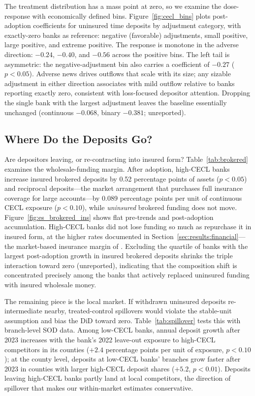The treatment distribution has a mass point at zero, so we examine the
dose-response with economically defined bins.  Figure~\ref{fig:cecl_bins}
plots post-adoption coefficients for uninsured time deposits by adjustment
category, with exactly-zero banks as reference: negative (favorable)
adjustments, small positive, large positive, and extreme positive.  The
response is monotone in the adverse direction: $-0.24$, $-0.40$, and
$-0.56$ across the positive bins.  The left tail is asymmetric: the
negative-adjustment bin also carries a coefficient of $-0.27$
($p<0.05$).  Adverse news drives outflows that scale with its size; any
sizable adjustment in either direction associates with mild outflow
relative to banks reporting exactly zero, consistent with loss-focused
depositor attention.  Dropping the single bank with the largest adjustment
leaves the baseline essentially unchanged (continuous $-0.068$, binary
$-0.381$; unreported).

\subsection{Where Do the Deposits Go?}
\label{sec:robustness:destination}

Are depositors leaving, or re-contracting into insured form?
Table~\ref{tab:brokered} examines the wholesale-funding margin.  After
adoption, high-CECL banks increase insured brokered deposits by 0.52
percentage points of assets ($p<0.05$) and reciprocal deposits---the
market arrangement that purchases full insurance coverage for large
accounts---by 0.089 percentage points per unit of continuous CECL exposure
($p<0.10$), while \emph{uninsured} brokered funding does not move.
Figure~\ref{fig:es_brokered_ins} shows flat pre-trends and post-adoption
accumulation.  High-CECL banks did not lose funding so much as repurchase
it in insured form, at the higher rates documented in
Section~\ref{sec:results:financial}---the market-based insurance margin of
\citet{kim2024insurance}.  Excluding the quartile of banks with the
largest post-adoption growth in insured brokered deposits shrinks the
triple interaction toward zero (unreported), indicating that the
composition shift is concentrated precisely among the banks that actively
replaced uninsured funding with insured wholesale money.

The remaining piece is the local market.  If withdrawn uninsured deposits
re-intermediate nearby, treated-control spillovers would violate the
stable-unit assumption and bias the DiD toward zero.
Table~\ref{tab:spillover} tests this with branch-level SOD data.  Among
low-CECL banks, annual deposit growth after 2023 increases with the
bank's 2022 leave-out exposure to high-CECL competitors in its counties
($+2.4$ percentage points per unit of exposure, $p<0.10$); at the county
level, deposits at low-CECL banks' branches grow faster after 2023 in
counties with larger high-CECL deposit shares ($+5.2$, $p<0.01$).
Deposits leaving high-CECL banks partly land at local competitors, the
direction of spillover that makes our within-market estimates
conservative.

